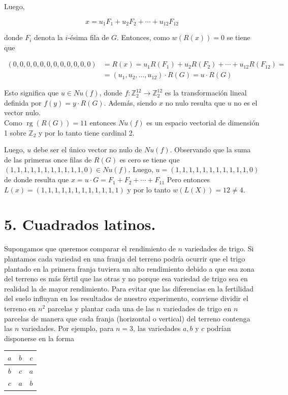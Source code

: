 \documentclass[10pt]{article}
\begin{document}
Luego,

$$
x=u_{1} F_{1}+u_{2} F_{2}+\cdots+u_{12} F_{12}
$$

donde $F_{i}$ denota la $i$-ésima fila de $G$. Entonces, como $w(R(x))=0$ se tiene que

$$
\begin{aligned}
(0,0,0,0,0,0,0,0,0,0,0,0) & =R(x)=u_{1} R\left(F_{1}\right)+u_{2} R\left(F_{2}\right)+\cdots+u_{12} R\left(F_{12}\right)= \\
& =\left(u_{1}, u_{2}, \ldots, u_{12}\right) \cdot R(G)=u \cdot R(G)
\end{aligned}
$$

Esto significa que $u \in N u(f)$, donde $f: \mathbb{Z}_{2}^{12} \longrightarrow \mathbb{Z}_{2}^{12}$ es la transformación lineal definida por $f(y)=y \cdot R(G)$. Además, siendo $x$ no nulo resulta que $u$ no es el vector nulo.\\
Como $\operatorname{rg}(R(G))=11$ entonces $N u(f)$ es un espacio vectorial de dimensión 1 sobre $\mathbb{Z}_{2}$ y por lo tanto tiene cardinal 2.

Luego, $u$ debe ser el único vector no nulo de $N u(f)$. Observando que la suma de las primeras once filas de $R(G)$ es cero se tiene que $(1,1,1,1,1,1,1,1,1,1,1,0) \in N u(f)$. Luego, $u=(1,1,1,1,1,1,1,1,1,1,1,0)$ de donde resulta que $x=u \cdot G=F_{1}+F_{2}+\cdots+F_{11}$ Pero entonces $L(x)=(1,1,1,1,1,1,1,1,1,1,1,1)$ y por lo tanto $w(L(X))=12 \neq 4$.

\section*{5. Cuadrados latinos.}
Supongamos que queremos comparar el rendimiento de $n$ variedades de trigo. Si plantamos cada variedad en una franja del terreno podría ocurrir que el trigo plantado en la primera franja tuviera un alto rendimiento debido a que esa zona del terreno es más fértil que las otras y no porque esa variedad de trigo sea en realidad la de mayor rendimiento. Para evitar que las diferencias en la fertilidad del suelo influyan en los resultados de nuestro experimento, conviene dividir el terreno en $n^{2}$ parcelas y plantar cada una de las $n$ variedades de trigo en $n$ parcelas de manera que cada franja (horizontal o vertical) del terreno contenga las $n$ variedades. Por ejemplo, para $n=3$, las variedades $a, b$ y $c$ podrían disponerse en la forma

\begin{center}
\begin{tabular}{|c|c|c|}
\hline
$a$ & $b$ & $c$ \\
\hline
$b$ & $c$ & $a$ \\
\hline
$c$ & $a$ & $b$ \\
\hline
\end{tabular}
\end{center}
\end{document}
